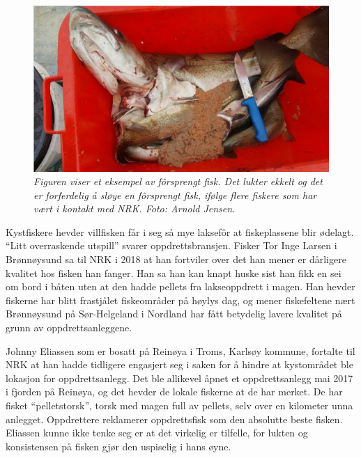 \begin{figure}
\begin{center} 
\includegraphics[scale=0.2]{figures/forsprengt}
\caption{\small \sl Figuren viser et eksempel av fôrsprengt fisk. Det lukter ekkelt og det er forferdelig å sløye en fôrsprengt fisk, ifølge flere fiskere som har vært i kontakt med NRK. Foto: Arnold Jensen. \cite{Trana m.fl. 2019} \label{fig:forsprengt}} 
\end{center} 
\end{figure} 

Kystfiskere hevder villfisken får i seg så mye laksefôr at fiskeplassene blir ødelagt. ``Litt overraskende utspill'' svarer oppdrettsbransjen. Fisker Tor Inge Larsen i Brønnøysund sa til NRK i 2018 at han fortviler over det han mener er dårligere kvalitet hos fisken han fanger. Han sa han kan knapt huske sist han fikk en sei om bord i båten uten at den hadde pellets fra lakseoppdrett i magen. Han hevder fiskerne har blitt frastjålet fiskeområder på høylys dag, og mener fiskefeltene nært Brønnøysund på Sør-Helgeland i Nordland har fått betydelig lavere kvalitet på grunn av oppdrettsanleggene. \cite{Olsen m.fl. 2018}

Johnny Eliassen som er bosatt på Reinøya i Troms, Karlsøy kommune, fortalte til NRK at han hadde tidligere engasjert seg i saken for å hindre at kystområdet ble lokasjon for oppdrettsanlegg. Det ble allikevel åpnet et oppdrettsanlegg mai 2017 i fjorden på Reinøya, og det hevder de lokale fiskerne at de har merket. De har fisket ``pelletstorsk'',  torsk med magen full av pellets, selv over en kilometer unna anlegget. Oppdrettere reklamerer oppdrettsfisk som den absolutte beste fisken. Eliassen kunne ikke tenke seg er at det virkelig er tilfelle, for lukten og konsistensen på fisken gjør den uspiselig i hans øyne. \cite{Jakobsen 2017}

